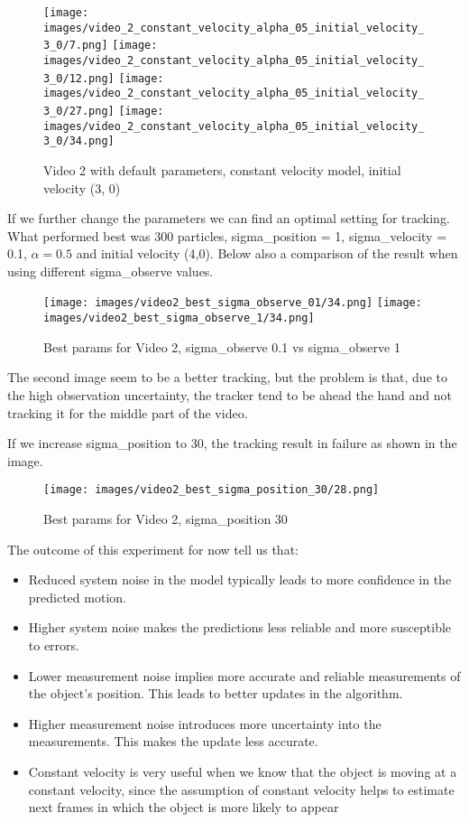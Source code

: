 \documentclass{ETHExercise}
\begin{document}
\begin{figure}[!h]
    \texttt{[image: images/video\_2\_constant\_velocity\_alpha\_05\_initial\_velocity\_3\_0/7.png]}
  \endminipage
    \texttt{[image: images/video\_2\_constant\_velocity\_alpha\_05\_initial\_velocity\_3\_0/12.png]}
  \endminipage
    \texttt{[image: images/video\_2\_constant\_velocity\_alpha\_05\_initial\_velocity\_3\_0/27.png]}
  \endminipage\space
    \texttt{[image: images/video\_2\_constant\_velocity\_alpha\_05\_initial\_velocity\_3\_0/34.png]}
  \endminipage
  \caption{Video 2 with default parameters, constant velocity model, initial velocity (3, 0)}
\end{figure}

If we further change the parameters we can find an optimal setting for tracking. What performed best was 300 particles,
sigma\_position = 1, sigma\_velocity = 0.1, $\alpha = 0.5$ and initial velocity (4,0).
Below also a comparison of the result when using different sigma\_observe values.
\newpage
\begin{figure}[!h]
    \texttt{[image: images/video2\_best\_sigma\_observe\_01/34.png]}
  \endminipage
    \texttt{[image: images/video2\_best\_sigma\_observe\_1/34.png]}
  \endminipage
  \caption{Best params for Video 2, sigma\_observe 0.1 vs sigma\_observe 1}
\end{figure}

The second image seem to be a better tracking, but the problem is that, due to the high observation uncertainty,
the tracker tend to be ahead the hand and not tracking it for the middle part of the video.

If we increase sigma\_position to 30, the tracking result in failure as shown in the image.
\begin{figure}[!h]
  \centering
    \texttt{[image: images/video2\_best\_sigma\_position\_30/28.png]}
  \caption{Best params for Video 2, sigma\_position 30}
\end{figure}

The outcome of this experiment for now tell us that:
\begin{itemize}
  \item Reduced system noise in the model typically leads to more confidence in the predicted motion. 
  \item Higher system noise makes the predictions less reliable and more susceptible to errors.
  \item Lower measurement noise implies more accurate and reliable measurements of the object's position.
  This leads to better updates in the algorithm.
  \item Higher measurement noise introduces more uncertainty into the measurements.
  This makes the update less accurate.
  \item Constant velocity is very useful when we know that the object is moving at a constant
  velocity, since the assumption of constant velocity helps to estimate next frames in which the object
  is more likely to appear
\end{itemize}
\end{document}
